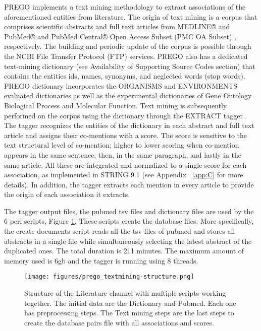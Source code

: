    PREGO implements a text mining methodology to extract associations of the aforementioned entities from literature. 
   The origin of text mining is a corpus that comprises scientific abstracts and full text articles from MEDLINE® and PubMed® and PubMed Central® Open Access Subset (PMC OA Subset) \parencite{sayers2021database}, respectively. 
   The building and periodic update of the corpus is possible through the NCBI File Transfer Protocol (FTP) services. 
   PREGO also has a dedicated text-mining dictionary (see Availability of Supporting Source Codes section) that contains the entities ids, names, synonyms, and neglected words (stop words). 
   PREGO dictionary incorporates the ORGANISMS \parencite{pafilis2013species} and ENVIRONMENTS \parencite{pafilis2015environments} evaluated dictionaries as well as the experimental dictionaries of Gene Ontology Biological Process and Molecular Function.
   Text mining is subsequently performed on the corpus using the dictionary through the EXTRACT tagger \parencite{pafilis2016extract, jensen2016one}. 
   The tagger recognizes the entities of the dictionary in each abstract and full text article and assigns their co-mentions with a score. 
   The score is sensitive to the text structural level of co-mention; higher to lower scoring when co-mention appears in the same sentence, then, in the same paragraph, and lastly in the same article. 
   All these are integrated and normalized to a single score for each association, as implemented in STRING 9.1 \parencite{franceschini2012string} (see Appendix ~\ref{app:C} for more details). 
   In addition, the tagger extracts each mention in every article to provide the origin of each association it extracts.

The tagger output files, the pubmed tsv files and dictionary files are used by
the 6 perl scripts, Figure \ref{fig:prego-textmining-structure}. These scripts create the database files. More specifically, 
the create documents script reads all the tsv files of pubmed and stores all abstracts
in a single file while simultaneously selecting the latest abstract of the duplicated ones. 
The total duration is 211 minutes. The maximum amount of memory used is 6gb and the tagger
is running using 8 threads.


   \begin{figure}[hbt!]
      \centering
      \texttt{[image: figures/prego\_textmining-structure.png]}
      \caption[PREGO analysis methodology]{
         Structure of the Literature channel with multiple scripts working together.
         The initial data are the Dictionary and Pubmed. Each one has preprocessing steps. 
         The Text mining steps are the last steps to create the database pairs file 
         with all associations and scores.
      }
      \label{fig:prego-textmining-structure}
   \end{figure}


